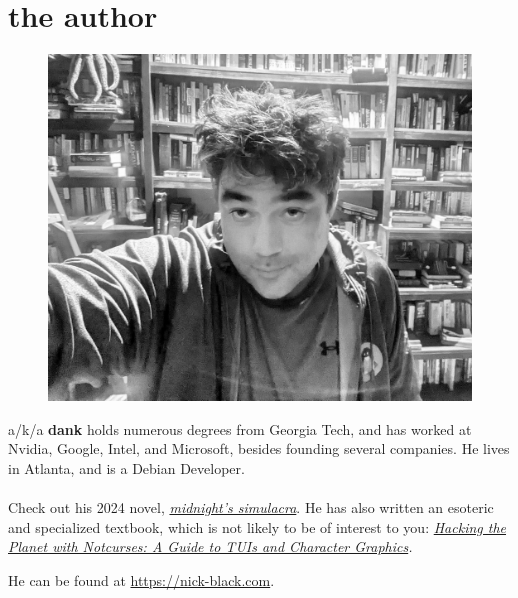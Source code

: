 \clearpage
\openany
\pagestyle{empty}
\chapter*{the author}
\nopagecolor
\begin{figure}[!tbp]
  \centering
  \includegraphics[width=\textwidth]{images/arrayfire.jpg}
\end{figure}
\bigskip
\noindent\textbf{\theauthor} a/k/a \textbf{dank} holds numerous degrees from Georgia Tech, and has worked
at Nvidia, Google, Intel, and Microsoft, besides founding several companies.
He lives in Atlanta, and is a Debian Developer.\\
\\
\noindent{}Check out his 2024 novel, \textit{\href{https://www.amazon.com/midnights-simulacra-Nick-Black/dp/B0CSVJZB4R}{midnight's simulacra}}.
He has also written an esoteric and specialized textbook, which is not
 likely to be of interest to you: \textit{\href{https://www.amazon.com/Hacking-Planet-Notcurses-Character-Graphics/dp/B086PNVNC9}{Hacking the Planet with Notcurses: A Guide to TUIs and Character Graphics}.}

\bigskip\noindent{}He can be found at \url{https://nick-black.com}.
